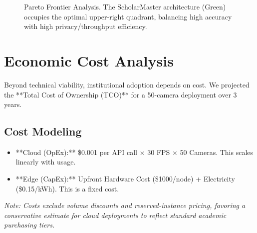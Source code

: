\documentclass[conference]{IEEEtran}
\begin{document}
\begin{figure}[htbp]
\centering
{}
\caption{Pareto Frontier Analysis. The ScholarMaster architecture (Green) occupies the optimal upper-right quadrant, balancing high accuracy with high privacy/throughput efficiency.}
\label{fig:pareto}
\end{figure}

\section{Economic Cost Analysis}
Beyond technical viability, institutional adoption depends on cost. We projected the **Total Cost of Ownership (TCO)** for a 50-camera deployment over 3 years.

\subsection{Cost Modeling}
\begin{itemize}
    \item **Cloud (OpEx):** \$0.001 per API call $\times$ 30 FPS $\times$ 50 Cameras. This scales linearly with usage.
    \item **Edge (CapEx):** Upfront Hardware Cost (\$1000/node) + Electricity (\$0.15/kWh). This is a fixed cost.
\end{itemize}

\textit{Note: Costs exclude volume discounts and reserved-instance pricing, favoring a conservative estimate for cloud deployments to reflect standard academic purchasing tiers.}
\end{document}
